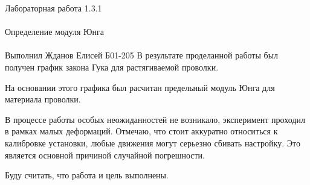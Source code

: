 \documentclass{astroedu-lab}
\begin{document}
\begin{problem}{\huge Лабораторная работа 1.3.1\\\\Определение модуля Юнга\\\\Выполнил Жданов Елисей Б01-205}
В результате проделанной работы был получен график закона Гука для растягиваемой проволки.

На основании этого графика был расчитан предельный модуль Юнга для материала проволки.

В процессе работы особых неожиданностей не возникало, эксперимент проходил в рамках малых деформаций. Отмечаю, что стоит аккуратно относиться к калибровке установки, любые движения могут серьезно сбивать настройку. Это является основной причиной случайной погрешности.

Буду считать, что работа и цель выполнены.

\end{problem}
\end{document}
